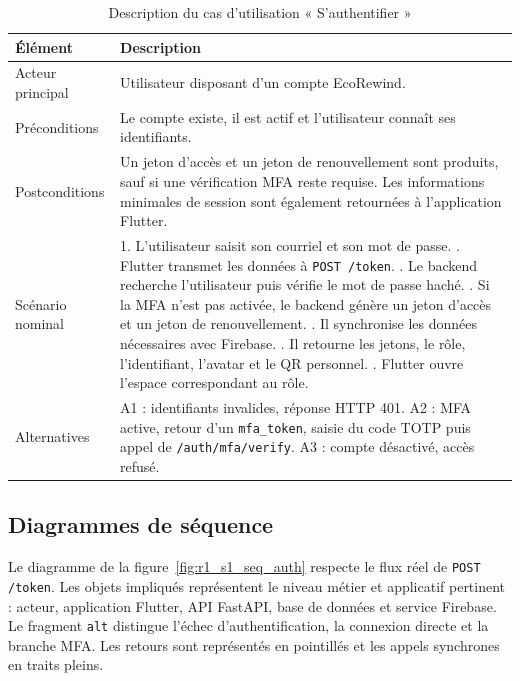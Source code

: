\begin{longtable}{|p{3.2cm}|p{10.2cm}|}
\caption{Description du cas d'utilisation « S'authentifier »}\label{tab:r1_uc_auth}\\
\hline\rowcolor{gray!20}\textbf{Élément} & \textbf{Description}\\\hline
Acteur principal & Utilisateur disposant d'un compte EcoRewind.\\\hline
Préconditions & Le compte existe, il est actif et l'utilisateur connaît ses identifiants.\\\hline
Postconditions & Un jeton d'accès et un jeton de renouvellement sont produits, sauf si une vérification MFA reste requise. Les informations minimales de session sont également retournées à l'application Flutter.\\\hline
Scénario nominal & 1. L'utilisateur saisit son courriel et son mot de passe. \newline 2. Flutter transmet les données à \texttt{POST /token}. \newline 3. Le backend recherche l'utilisateur puis vérifie le mot de passe haché. \newline 4. Si la MFA n'est pas activée, le backend génère un jeton d'accès et un jeton de renouvellement. \newline 5. Il synchronise les données nécessaires avec Firebase. \newline 6. Il retourne les jetons, le rôle, l'identifiant, l'avatar et le QR personnel. \newline 7. Flutter ouvre l'espace correspondant au rôle.\\\hline
Alternatives & A1 : identifiants invalides, réponse HTTP 401. \newline A2 : MFA active, retour d'un \texttt{mfa\_token}, saisie du code TOTP puis appel de \texttt{/auth/mfa/verify}. \newline A3 : compte désactivé, accès refusé.\\\hline
\end{longtable}

\subsection{Diagrammes de séquence}

Le diagramme de la figure~\ref{fig:r1_s1_seq_auth} respecte le flux réel de \texttt{POST /token}. Les objets impliqués représentent le niveau métier et applicatif pertinent : acteur, application Flutter, API FastAPI, base de données et service Firebase. Le fragment \texttt{alt} distingue l'échec d'authentification, la connexion directe et la branche MFA. Les retours sont représentés en pointillés et les appels synchrones en traits pleins.

